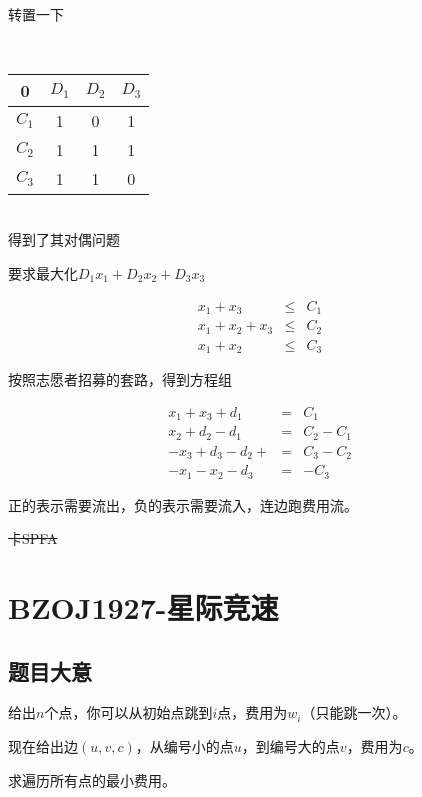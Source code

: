 \documentclass{ctexart}
\numberwithin{equation}{section}
\begin{document}
\begin{flushleft}
  ~\\
  
  转置一下

  ~\\
  
  \begin{tabular}{c|ccc}
    \hline 0&$D_1$&$D_2$&$D_3$\\
	\hline $C_1$&1&0&1\\
	\hline $C_2$&1&1&1\\
	\hline $C_3$&1&1&0\\
	\hline
  \end{tabular}

  ~\\
  
  得到了其对偶问题

  要求最大化$D_1x_1+D_2x_2+D_3x_3$
  
  \begin{eqnarray*} 
    x_1+x_3 &\le& C_1 \\
    x_1+x_2+x_3 &\le& C_2\\
    x_1+x_2 &\le& C_3
  \end{eqnarray*}

  按照志愿者招募的套路，得到方程组

  \begin{eqnarray*} 
    x_1+x_3+d_1 &=& C_1 \\
    x_2+d_2-d_1 &=& C_2-C_1\\
    -x_3+d_3-d_2+ &=& C_3-C_2\\
    -x_1-x_2-d_3 &=& -C_3
  \end{eqnarray*}

  正的表示需要流出，负的表示需要流入，连边跑费用流。

  \sout{卡SPFA}
  
  \newpage

  \section{BZOJ1927-星际竞速}
  \subsection{题目大意}
  给出$n$个点，你可以从初始点跳到$i$点，费用为$w_i$（只能跳一次）。

  现在给出边$(u,v,c)$，从编号小的点$u$，到编号大的点$v$，费用为$c$。

  求遍历所有点的最小费用。
  
    

\end{flushleft}
\end{document}
